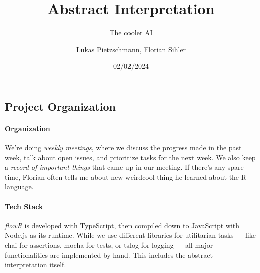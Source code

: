 \documentclass[color,coloraccent=red!60!black]{poster}
\title{Abstract Interpretation}
\subtitle{The cooler AI}
\author{Lukas Pietzschmann, Florian Sihler}
\institute{Institute of Software Engineering and Programming Languages}
\date{02/02/2024}
\begin{document}
\maketitle


\begin{multicols}{3}
	\begin{minipage}{\dimexpr2\columnwidth+\columnsep\relax}
		\lipsum[1-4]
	\end{minipage}\vfill\columnbreak\null\columnbreak
	\section*{Project Organization}
	\paragraph{Organization} We're doing \emph{weekly meetings}, where we discuss the
	progress made in the past week, talk about open issues, and prioritize tasks for the
	next week. We also keep a \emph{record of important things} that came up in our
	meeting. If there's any spare time, Florian often tells me about new
	\sout{weird}cool thing he learned about the R language.
	\paragraph{Tech Stack} \textit{flowR} is developed with TypeScript, then compiled
	down to JavaScript with Node.js as its runtime. While we use different libraries for
	utilitarian tasks --- like chai for assertions, mocha for tests, or tslog for
	logging --- all major functionalities are implemented by hand. This includes
	the abstract interpretation itself.

\end{multicols}
\end{document}
